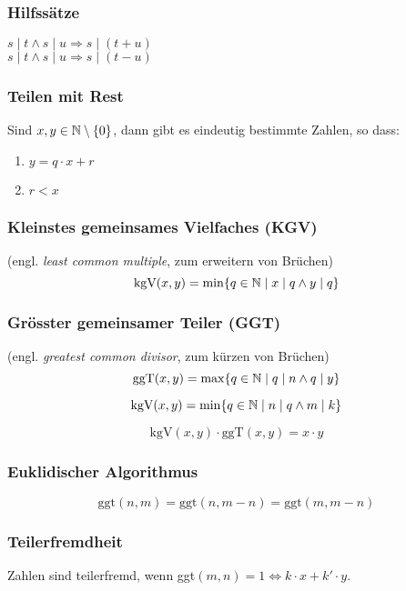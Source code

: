 \subsubsection{Hilfssätze}
$s \mid t \wedge s \mid u \Rightarrow s \mid (t + u)$\\
$s \mid t \wedge s \mid u \Rightarrow s \mid (t - u)$\\

\subsubsection{Teilen mit Rest}
Sind $x, y \in \mathbb{N} \setminus \{0\}$, dann gibt es eindeutig bestimmte Zahlen, so dass:
\begin{enumerate}
	\item $y = q \cdot x + r$
	\item $r < x$
\end{enumerate}

\subsubsection{Kleinstes gemeinsames Vielfaches (KGV)}
(engl. \textit{least common multiple}, zum erweitern von Brüchen)\\
\begin{equation*}
	\mbox{kgV}(x, y) = \min\{q \in \mathbb{N} \mid x \mid q \wedge y \mid q\}
\end{equation*}


\subsubsection{Grösster gemeinsamer Teiler (GGT)}
(engl. \textit{greatest common divisor}, zum kürzen von Brüchen)\\
\begin{equation*}
	\mbox{ggT}(x, y) = \max\{q \in \mathbb{N} \mid q \mid n \wedge q \mid y\}
\end{equation*}

\begin{equation*}
	\mbox{kgV}(x, y) = \min\{q \in \mathbb{N} \mid n\mid q \wedge m \mid k\}
\end{equation*}

\begin{equation*}
	\mbox{kgV}(x, y) \cdot \mbox{ggT}(x, y) = x \cdot y
\end{equation*}


\subsubsection{Euklidischer Algorithmus}
\begin{equation*}
	\mbox{ggt}(n, m) = \mbox{ggt}(n, m - n) = \mbox{ggt}(m, m - n)
\end{equation*}

\subsubsection{Teilerfremdheit}
Zahlen sind teilerfremd, wenn ggt$(m, n) = 1 \Leftrightarrow k \cdot x + k' \cdot y$.
